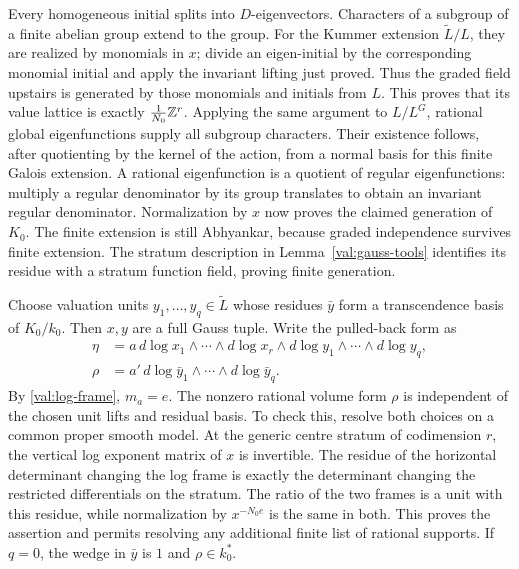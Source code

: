 Every homogeneous initial splits into $D$-eigenvectors. Characters
of a subgroup of a finite abelian group extend to the group. For
the Kummer extension $\widetilde L/L$, they are realized by
monomials in $x$; divide an eigen-initial by the corresponding
monomial initial and apply the invariant lifting just proved.
Thus the graded field upstairs is generated by those monomials
and initials from $L$. This proves that its value lattice is exactly
$\frac1{N_0}\mathbb Z^r$. Applying the same argument to $L/L^G$, rational
global eigenfunctions supply all subgroup characters. Their existence
follows, after quotienting by the kernel of the action, from a
normal basis for this finite Galois extension. A rational
eigenfunction is a quotient of regular eigenfunctions: multiply a
regular denominator by its group translates to obtain an invariant
regular denominator. Normalization by $x$ now proves the claimed
generation of $K_0$. The finite extension is still Abhyankar,
because graded independence survives finite extension. The
stratum description in Lemma~\ref{val:gauss-tools} identifies its
residue with a stratum function field, proving finite generation.

Choose valuation units $y_1,\ldots,y_q\in\widetilde L$ whose
residues $\bar y$ form a transcendence basis of $K_0/k_0$. Then
$x,y$ are a full Gauss tuple. Write the pulled-back form as
\begin{equation}\label{car:residual-form}
 \begin{aligned}
 \eta&=a\,d\log x_1\wedge\cdots\wedge d\log x_r
             \wedge d\log y_1\wedge\cdots\wedge d\log y_q,\\
 \rho&=a'\,d\log\bar y_1\wedge\cdots\wedge d\log\bar y_q.
 \end{aligned}
\end{equation}
By \eqref{val:log-frame}, $m_a=e$. The nonzero rational volume form
$\rho$ is independent of the chosen unit lifts and residual basis.
To check this, resolve both choices on a common proper smooth model.
At the generic centre stratum of codimension $r$, the vertical log
exponent matrix of $x$ is invertible. The residue of the horizontal
determinant changing the log frame is exactly the determinant
changing the restricted differentials on the stratum. The ratio
of the two frames is a unit with this residue, while normalization
by $x^{-N_0e}$ is the same in both. This proves the assertion and
permits resolving any additional finite list of rational supports.
If $q=0$, the wedge in $\bar y$ is $1$ and $\rho\in k_0^*$.

